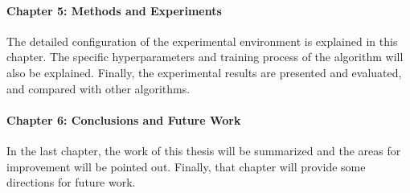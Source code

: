 \paragraph{Chapter 5: Methods and Experiments}
The detailed configuration of the experimental environment is explained in this chapter. The specific hyperparameters and training process of the algorithm will also be explained. Finally, the experimental results are presented and evaluated, and compared with other algorithms. 

\paragraph{Chapter 6: Conclusions and Future Work}
In the last chapter, the work of this thesis will be summarized and the areas for improvement will be pointed out. Finally, that chapter will provide some directions for future work.